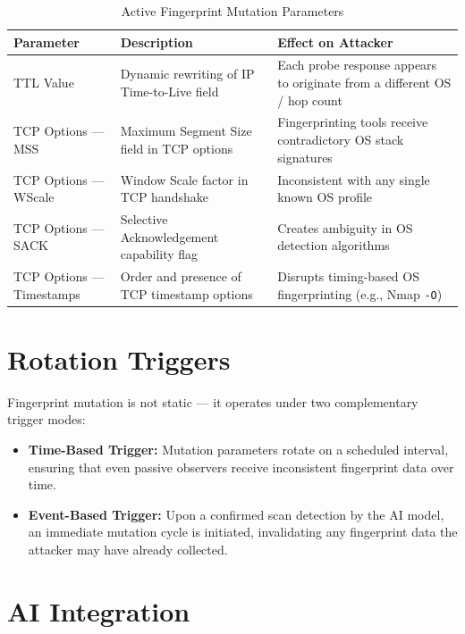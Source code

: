 \documentclass[12pt,a4paper]{report}
\begin{document}
\begin{table}[h!]
\centering
\caption{Active Fingerprint Mutation Parameters}
\begin{tabular}{@{}L{4cm} L{5.5cm} L{5cm}@{}}
  \toprule
  \textbf{Parameter} & \textbf{Description} & \textbf{Effect on Attacker} \\
  \midrule
  TTL Value
    & Dynamic rewriting of IP Time-to-Live field
    & Each probe response appears to originate from a different OS / hop count \\
  \addlinespace
  TCP Options --- MSS
    & Maximum Segment Size field in TCP options
    & Fingerprinting tools receive contradictory OS stack signatures \\
  \addlinespace
  TCP Options --- WScale
    & Window Scale factor in TCP handshake
    & Inconsistent with any single known OS profile \\
  \addlinespace
  TCP Options --- SACK
    & Selective Acknowledgement capability flag
    & Creates ambiguity in OS detection algorithms \\
  \addlinespace
  TCP Options --- Timestamps
    & Order and presence of TCP timestamp options
    & Disrupts timing-based OS fingerprinting (e.g., Nmap \texttt{-O}) \\
  \bottomrule
\end{tabular}
\label{tab:mutation-params}
\end{table}

\section{Rotation Triggers}

Fingerprint mutation is not static --- it operates under two complementary trigger modes:

\begin{itemize}[nosep, leftmargin=1.5em]
  \item \textbf{Time-Based Trigger:} Mutation parameters rotate on a scheduled interval,
        ensuring that even passive observers receive inconsistent fingerprint data over time.
  \item \textbf{Event-Based Trigger:} Upon a confirmed scan detection by the AI model, an
        immediate mutation cycle is initiated, invalidating any fingerprint data the attacker
        may have already collected.
\end{itemize}

\section{AI Integration}
\end{document}
